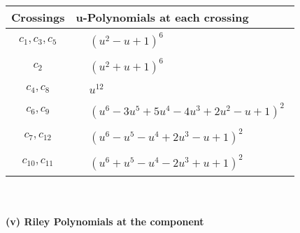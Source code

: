 \documentclass[1p]{elsarticle_modified}
\theoremstyle{definition}
\begin{document}
\begin{tabular}{m{50pt}|m{274pt}}
Crossings & \hspace{64pt}u-Polynomials at each crossing \\
\hline $$\begin{aligned}c_{1},c_{3},c_{5}\end{aligned}$$&$\begin{aligned}
&(u^2- u+1)^6
\end{aligned}$\\
\hline $$\begin{aligned}c_{2}\end{aligned}$$&$\begin{aligned}
&(u^2+u+1)^6
\end{aligned}$\\
\hline $$\begin{aligned}c_{4},c_{8}\end{aligned}$$&$\begin{aligned}
&u^{12}
\end{aligned}$\\
\hline $$\begin{aligned}c_{6},c_{9}\end{aligned}$$&$\begin{aligned}
&(u^6-3 u^5+5 u^4-4 u^3+2 u^2- u+1)^2
\end{aligned}$\\
\hline $$\begin{aligned}c_{7},c_{12}\end{aligned}$$&$\begin{aligned}
&(u^6- u^5- u^4+2 u^3- u+1)^2
\end{aligned}$\\
\hline $$\begin{aligned}c_{10},c_{11}\end{aligned}$$&$\begin{aligned}
&(u^6+u^5- u^4-2 u^3+u+1)^2
\end{aligned}$\\
\hline
\end{tabular}\\~\\
\newpage\renewcommand{\arraystretch}{1}
\flushleft \textbf{(v) Riley Polynomials at the component}\newline \\
\end{document}
